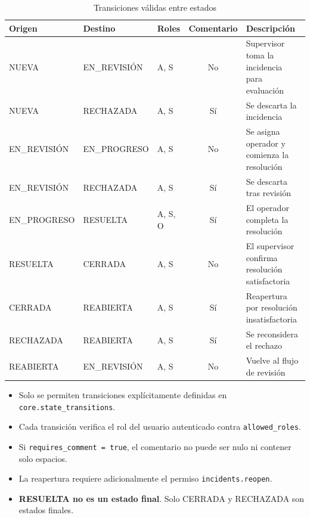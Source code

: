 \documentclass[11pt, a4paper]{article}
\begin{document}
\begin{table}[H]
\centering
\small
\begin{tabularx}{\textwidth}{l l l c X}
  \toprule
  \textbf{Origen} & \textbf{Destino} & \textbf{Roles} & \textbf{Comentario} & \textbf{Descripción} \\
  \midrule
  NUEVA       & EN\_REVISIÓN  & A, S    & No  & Supervisor toma la incidencia para evaluación \\
  NUEVA       & RECHAZADA     & A, S    & Sí  & Se descarta la incidencia \\
  EN\_REVISIÓN & EN\_PROGRESO & A, S    & No  & Se asigna operador y comienza la resolución \\
  EN\_REVISIÓN & RECHAZADA    & A, S    & Sí  & Se descarta tras revisión \\
  EN\_PROGRESO & RESUELTA     & A, S, O & Sí  & El operador completa la resolución \\
  RESUELTA    & CERRADA       & A, S    & No  & El supervisor confirma resolución satisfactoria \\
  CERRADA     & REABIERTA     & A, S    & Sí  & Reapertura por resolución insatisfactoria \\
  RECHAZADA   & REABIERTA     & A, S    & Sí  & Se reconsidera el rechazo \\
  REABIERTA   & EN\_REVISIÓN  & A, S    & No  & Vuelve al flujo de revisión \\
  \bottomrule
\end{tabularx}
\caption{Transiciones válidas entre estados}
\end{table}

\begin{restriccion}
\begin{itemize}
  \item Solo se permiten transiciones explícitamente definidas en \texttt{core.state\_transitions}.
  \item Cada transición verifica el rol del usuario autenticado contra \texttt{allowed\_roles}.
  \item Si \texttt{requires\_comment = true}, el comentario no puede ser nulo ni contener solo espacios.
  \item La reapertura requiere adicionalmente el permiso \texttt{incidents.reopen}.
  \item \textbf{RESUELTA no es un estado final}. Solo CERRADA y RECHAZADA son estados finales.
\end{itemize}
\end{restriccion}
\end{document}
